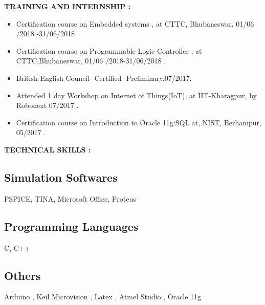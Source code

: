 \documentclass[a4]{article}
\begin{document}
\vspace{3mm}
\textbf{TRAINING AND INTERNSHIP : } 
\begin{itemize}
	\item Certification course on Embedded systems , at CTTC, Bhubaneswar, 01/06
/2018 -31/06/2018 .
	\item Certification course on Programmable Logic Controller , at CTTC,Bhubaneswar, 01/06
/2018-31/06/2018 .
         \item British English Council- Certified -Preliminary,07/2017. 
         \item Attended 1 day Workshop on Internet of Things(IoT), at IIT-Kharagpur, by Robonext 07/2017 .
         \item Certification course on Introduction to Oracle 11g:SQL  at, NIST, Berhampur, 
05/2017 .
\end{itemize}

\vspace{3mm}
\textbf{TECHNICAL SKILLS : } 

\subsection{Simulation Softwares}	
      PSPICE, TINA, Microsoft Office, Proteus
\subsection{Programming Languages}
 C, C++
\subsection{Others}
Arduino , Keil Microvision , Latex , Atmel Studio , Oracle 11g
\end{document}
